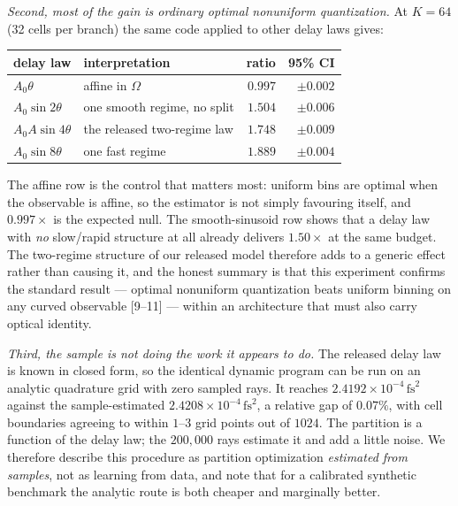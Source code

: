 \documentclass[11pt]{article}
\begin{document}
\emph{Second, most of the gain is ordinary optimal nonuniform quantization.} At
$K = 64$ (32 cells per branch) the same code applied to other delay laws gives:
\begin{center}
\begin{tabular}{llrr}
\toprule
delay law & interpretation & ratio & 95\% CI \\
\midrule
$A_0\theta$          & affine in $\Omega$            & $0.997$ & $\pm 0.002$ \\
$A_0\sin 2\theta$    & one smooth regime, no split   & $1.504$ & $\pm 0.006$ \\
$A_0 A\sin4\theta$   & the released two-regime law    & $1.748$ & $\pm 0.009$ \\
$A_0\sin 8\theta$    & one fast regime                & $1.889$ & $\pm 0.004$ \\
\bottomrule
\end{tabular}
\end{center}
The affine row is the control that matters most: uniform bins are optimal when the
observable is affine, so the estimator is not simply favouring itself, and $0.997\times$
is the expected null. The smooth-sinusoid row shows that a delay law with \emph{no}
slow/rapid structure at all already delivers $1.50\times$ at the same budget. The
two-regime structure of our released model therefore adds to a generic effect rather
than causing it, and the honest summary is that this experiment confirms the standard
result --- optimal nonuniform quantization beats uniform binning on any curved observable
[9--11] --- within an architecture that must also carry optical identity.

\emph{Third, the sample is not doing the work it appears to do.} The released delay law is
known in closed form, so the identical dynamic program can be run on an analytic
quadrature grid with zero sampled rays. It reaches $2.4192\times10^{-4}\,\mathrm{fs}^2$
against the sample-estimated $2.4208\times10^{-4}\,\mathrm{fs}^2$, a relative gap of
$0.07\%$, with cell boundaries agreeing to within $1$--$3$ grid points out of $1024$. The
partition is a function of the delay law; the $200{,}000$ rays estimate it and add a
little noise. We therefore describe this procedure as partition optimization
\emph{estimated from samples}, not as learning from data, and note that for a calibrated
synthetic benchmark the analytic route is both cheaper and marginally better.
\end{document}
